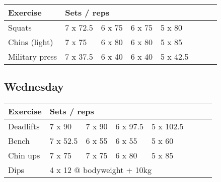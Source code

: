 \documentclass[12pt, a4paper]{article}%
\begin{document}
  \begin{tabular}{l|lllllll}
  \hspace{0.75em} \textbf{Exercise} & \multicolumn{ 7 }{l}{ \textbf{Sets / reps} } \\ \hline

            \hspace{0.75em} Squats
            & 7 x 72.5
            & 6 x 75
            & 6 x 75
            & 5 x 80
            & 
            & 
            & 
            \\


            \hspace{0.75em} Chins (light)
            & 7 x 75
            & 6 x 80
            & 6 x 80
            & 5 x 85
            & 
            & 
            & 
            \\


            \hspace{0.75em} Military press
            & 7 x 37.5
            & 6 x 40
            & 6 x 40
            & 5 x 42.5
            & 
            & 
            & 
            \\


  \end{tabular}

  \subsection*{\hspace{0.5em} Wednesday }


  \begin{tabular}{l|lllllll}
  \hspace{0.75em} \textbf{Exercise} & \multicolumn{ 7 }{l}{ \textbf{Sets / reps} } \\ \hline

            \hspace{0.75em} Deadlifts
            & 7 x 90
            & 7 x 90
            & 6 x 97.5
            & 5 x 102.5
            & 
            & 
            & 
            \\


            \hspace{0.75em} Bench
            & 7 x 52.5
            & 6 x 55
            & 6 x 55
            & 5 x 60
            & 
            & 
            & 
            \\


            \hspace{0.75em} Chin ups
            & 7 x 75
            & 7 x 75
            & 6 x 80
            & 5 x 85
            & 
            & 
            & 
            \\


   \hspace{0.75em} Dips &  \multicolumn{ 7 }{l}{ 4 x 12 @ bodyweight + 10kg } \\
  \end{tabular}
\end{document}
